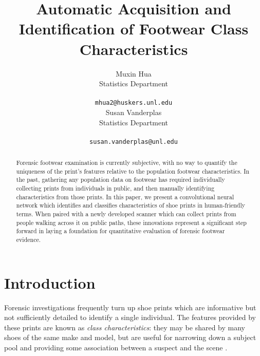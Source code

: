 \documentclass[10pt]{article}
\author{Muxin Hua\\
  Statistics Department\\ \\
{\tt mhua2@huskers.unl.edu}\\\And Susan Vanderplas\\
  Statistics Department\\ \\
{\tt susan.vanderplas@unl.edu}\\}
\title{Automatic Acquisition and Identification of Footwear Class
Characteristics}
\date{}
\newcommand{\svp}[1]{{\textcolor{RedOrange}{#1}}}
\begin{document}
\maketitle
\begin{abstract}
\svp{Forensic footwear examination is currently subjective, with no way to quantify the uniqueness of the print's features relative to the population footwear characteristics.
In the past, gathering any population data on footwear has required individually collecting prints from individuals in public, and then manually identifying characteristics from those prints.
In this paper, we present a convolutional neural network which identifies and classifies characteristics of shoe prints in human-friendly terms.
When paired with a newly developed scanner which can collect prints from people walking across it on public paths, these innovations represent a significant step forward in laying a foundation for quantitative evaluation of forensic footwear evidence.}

\end{abstract}


\section{Introduction}
\svp{Forensic investigations frequently turn up shoe prints which are informative but not sufficiently detailed to identify a single individual. The features provided by these prints are known as \emph{class characteristics}: they may be shared by many shoes of the same make and model, but are useful for narrowing down a subject pool and providing some association between a suspect and the scene \cite{bodziakFootwearImpressionEvidence2000}.}
\end{document}
